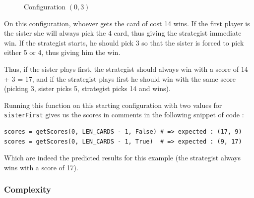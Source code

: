 \documentclass[a4paper,12pt,fleqn]{article}
\newcommand\ezskip{\medskip\noindent}
\begin{document}
\begin{figure}[H]
    \centering
    \caption{Configuration $(0,3)$}
    \label{fig:recursive_05}
\end{figure}

On this configuration, whoever gets the card of cost 14 wins.
If the first player is the sister she will always pick the 4 card, thus giving the strategist immediate win. If the strategist starts, he should pick 3 so that the sister is forced to pick either 5 or 4, thus giving him the win.

\ezskip
Thus, if the sister plays first, the strategist should always win with a score of 14 + 3 = 17, and if the strategist plays first he should win with the same score (picking 3, sister picks 5, strategist picks 14 and wins).

\ezskip
Running this function on this starting configuration with two values for \texttt{sisterFirst} gives us the scores in comments in the following snippet of code :

\begin{verbatim}
scores = getScores(0, LEN_CARDS - 1, False) # => expected : (17, 9)
scores = getScores(0, LEN_CARDS - 1, True)  # => expected : (9, 17)
\end{verbatim}

Which are indeed the predicted results for this example (the strategist always wins with a score of 17).

\subsubsection{Complexity}
\end{document}
